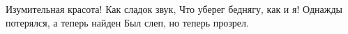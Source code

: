 Изумительная красота!
Как сладок звук,
Что уберег беднягу, как и я!
Однажды потерялся,
а теперь найден
Был слеп, но теперь прозрел.
